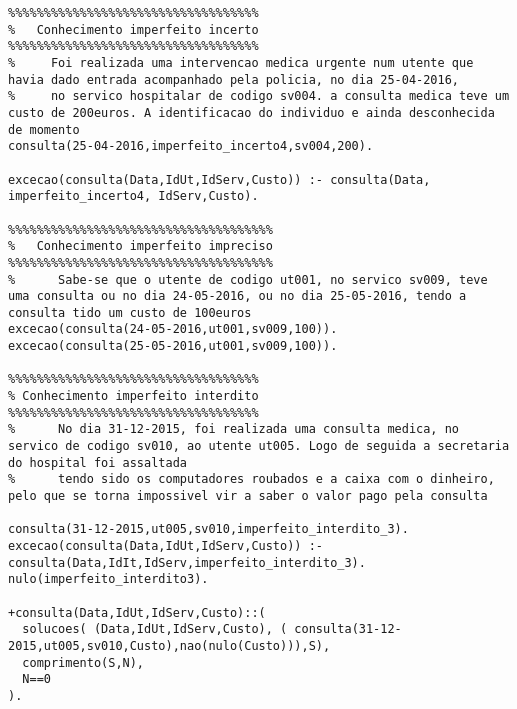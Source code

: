 \documentclass[
  oneside,
  10pt, a4paper,
  footinclude=true,
  headinclude=true,
  cleardoublepage=empty
]{scrbook}
\begin{document}
\begin{lstlisting}
%%%%%%%%%%%%%%%%%%%%%%%%%%%%%%%%%%%
%   Conhecimento imperfeito incerto
%%%%%%%%%%%%%%%%%%%%%%%%%%%%%%%%%%%
%     Foi realizada uma intervencao medica urgente num utente que havia dado entrada acompanhado pela policia, no dia 25-04-2016,
%     no servico hospitalar de codigo sv004. a consulta medica teve um custo de 200euros. A identificacao do individuo e ainda desconhecida de momento
consulta(25-04-2016,imperfeito_incerto4,sv004,200).

excecao(consulta(Data,IdUt,IdServ,Custo)) :- consulta(Data, imperfeito_incerto4, IdServ,Custo).

%%%%%%%%%%%%%%%%%%%%%%%%%%%%%%%%%%%%%
%   Conhecimento imperfeito impreciso
%%%%%%%%%%%%%%%%%%%%%%%%%%%%%%%%%%%%%
%      Sabe-se que o utente de codigo ut001, no servico sv009, teve uma consulta ou no dia 24-05-2016, ou no dia 25-05-2016, tendo a consulta tido um custo de 100euros
excecao(consulta(24-05-2016,ut001,sv009,100)).
excecao(consulta(25-05-2016,ut001,sv009,100)).

%%%%%%%%%%%%%%%%%%%%%%%%%%%%%%%%%%%
% Conhecimento imperfeito interdito
%%%%%%%%%%%%%%%%%%%%%%%%%%%%%%%%%%%
%      No dia 31-12-2015, foi realizada uma consulta medica, no servico de codigo sv010, ao utente ut005. Logo de seguida a secretaria do hospital foi assaltada
%      tendo sido os computadores roubados e a caixa com o dinheiro, pelo que se torna impossivel vir a saber o valor pago pela consulta 

consulta(31-12-2015,ut005,sv010,imperfeito_interdito_3).
excecao(consulta(Data,IdUt,IdServ,Custo)) :- consulta(Data,IdIt,IdServ,imperfeito_interdito_3).
nulo(imperfeito_interdito3).

+consulta(Data,IdUt,IdServ,Custo)::(
  solucoes( (Data,IdUt,IdServ,Custo), ( consulta(31-12-2015,ut005,sv010,Custo),nao(nulo(Custo))),S),
  comprimento(S,N),
  N==0
).
	\end{lstlisting}	
\end{document}

